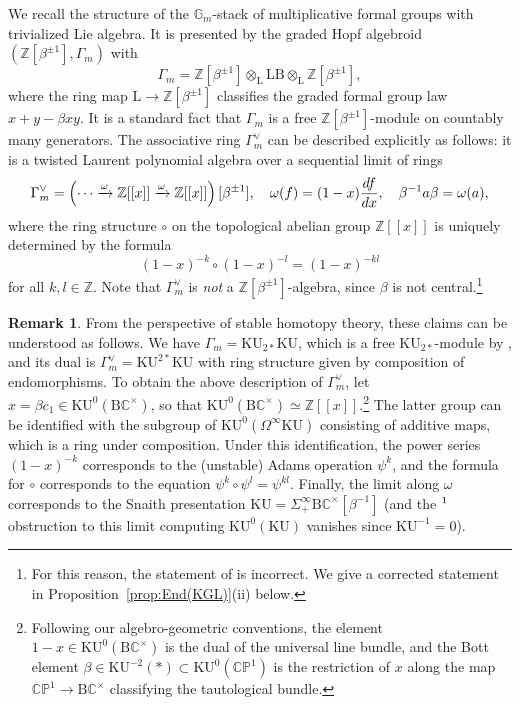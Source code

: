 \documentclass{amsart}
\numberwithin{equation}{section}
\theoremstyle{plain}
\theoremstyle{definition}
\newtheorem{remark}[equation]{Remark}
\let\bb=\mathbb
\let\rm=\mathrm
\def\Z{\bb Z}
\def\C{\bb C}
\def\P{\bb P}
\def\G{\mathbb G}
\def\L{\mathrm{L}{}}
\def\LB{\mathrm{LB}{}}
\def\KU{\mathrm{KU}}
\let\lim=\relax
\DeclareMathOperator*{\lim}{lim}
\begin{document}
We recall the structure of the $\G_m$-stack of multiplicative formal groups with trivialized Lie algebra.
It is presented by the graded Hopf algebroid $(\Z[\beta^{\pm 1}],\Gamma_m)$ with
\[
\Gamma_m=\Z[\beta^{\pm 1}]\otimes_\L\LB\otimes_\L\Z[\beta^{\pm 1}],
\]
where the ring map $\L\to\Z[\beta^{\pm 1}]$ classifies the graded formal group law $x+y-\beta xy$.
It is a standard fact that $\Gamma_m$ is a free $\Z[\beta^{\pm 1}]$-module on countably many generators. 
The associative ring $\Gamma_m^\vee$ can be described explicitly as follows: it is a twisted Laurent polynomial algebra over a sequential limit of rings
\begin{equation}\label{eqn:Gamma_m}
\Gamma_m^\vee=\lim\left(\dotsb \xrightarrow{\omega} \Z[[x]] \xrightarrow{\omega} \Z[[x]]\right)[\beta^{\pm 1}], \quad \omega(f)=(1-x)\frac{df}{dx},\quad \beta^{-1}a\beta = \omega(a),
\end{equation}
where the ring structure $\circ$ on the topological abelian group $\Z[[x]]$ is uniquely determined by the formula
\[
(1-x)^{-k}\circ (1-x)^{-l}=(1-x)^{-kl}
\]
for all $k,l\in\Z$. Note that $\Gamma_m^\vee$ is \emph{not} a $\Z[\beta^{\pm 1}]$-algebra, since $\beta$ is not central.\footnote{For this reason, the statement of \cite[Theorem 9.3]{Naumann:2009} is incorrect. We give a corrected statement in Proposition~\ref{prop:End(KGL)}(ii) below.}

\begin{remark}
	From the perspective of stable homotopy theory, these claims can be understood as follows. We have $\Gamma_m=\KU_{2*}\KU$, which is a free $\KU_{2*}$-module by \cite[Theorem 2.1]{AdamsClarke}, and its dual is $\Gamma_m^\vee=\KU^{2*}\KU$ with ring structure given by composition of endomorphisms. To obtain the above description of $\Gamma_m^\vee$, let $x=\beta c_1\in \KU^0(\rm B\C^\times)$, so that $\KU^{0}(\rm B\C^\times)\simeq \Z[[x]]$.\footnote{Following our algebro-geometric conventions, the element $1-x\in \KU^0(\rm B\C^\times)$ is the dual of the universal line bundle, and the Bott element $\beta\in \KU^{-2}(*)\subset \KU^0(\C\P^1)$ is the restriction of $x$ along the map $\C\P^1\to \rm B\C^\times$ classifying the tautological bundle.} The latter group can be identified with the subgroup of $\KU^{0}(\Omega^\infty\KU)$ consisting of additive maps, which is a ring under composition.
	Under this identification, the power series $(1-x)^{-k}$ corresponds to the (unstable) Adams operation $\psi^k$, and the formula for $\circ$ corresponds to the equation $\psi^k\circ\psi^l=\psi^{kl}$. Finally, the limit along $\omega$ corresponds to the Snaith presentation $\KU=\Sigma^\infty_+ \rm B\C^\times[\beta^{-1}]$ (and the $\lim^1$ obstruction to this limit computing $\KU^{0}(\KU)$ vanishes since $\KU^{-1}=0$).
\end{remark}
\end{document}
